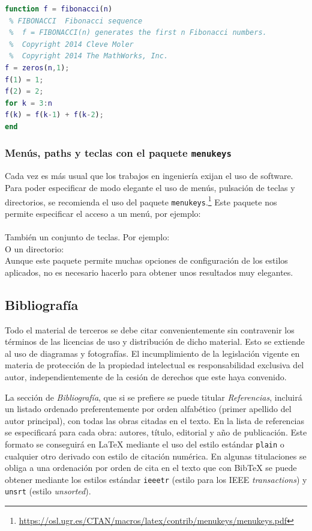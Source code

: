 \begin{lstlisting}[style=ruled,language=Matlab,caption={Ejemplo de script en Matlab},label=lst:matlab]
function f = fibonacci(n)
 % FIBONACCI  Fibonacci sequence
 %	f = FIBONACCI(n) generates the first n Fibonacci numbers.
 %	Copyright 2014 Cleve Moler
 %	Copyright 2014 The MathWorks, Inc.
f = zeros(n,1); 
f(1) = 1;
f(2) = 2;
for k = 3:n
f(k) = f(k-1) + f(k-2);
end
\end{lstlisting}



\subsubsection{Menús, paths y teclas con el paquete \texttt{menukeys}}
Cada vez es más usual que los trabajos en ingeniería exijan el uso de 
software. Para poder especificar de modo elegante el uso de menús, pulsación de 
teclas y directorios, se recomienda el uso del paquete 
\texttt{menukeys}.\footnote{\url{https://osl.ugr.es/CTAN/macros/latex/contrib/menukeys/menukeys.pdf}}
  Este paquete nos permite especificar el acceso a un menú, por 
ejemplo:\\

\noindent {}\\

\noindent También un conjunto de teclas. Por ejemplo:
\\

\noindent O un directorio:
\\

\noindent Aunque este paquete permite muchas opciones de configuración de los estilos aplicados, no es necesario hacerlo para obtener unos resultados muy elegantes.


\subsection{Bibliografía}
Todo el material de terceros se debe citar convenientemente sin contravenir los términos de las licencias de uso y distribución de dicho material. Esto se extiende al uso de diagramas y fotografías. El incumplimiento de la legislación vigente en materia de protección de la propiedad intelectual es responsabilidad exclusiva del autor, independientemente de la cesión de derechos que este haya convenido.

La sección de \emph{Bibliografía}, que si se prefiere se puede titular \emph{Referencias}, incluirá un listado ordenado preferentemente por orden alfabético (primer apellido del autor principal), con todas las obras citadas en el texto. En la lista de referencias se especificará para cada obra: autores, título, editorial y año de publicación. Este formato se conseguirá en \LaTeX{} mediante el uso del estilo estándar \texttt{plain} o cualquier otro derivado con estilo de citación numérica. En algunas titulaciones se obliga a una ordenación por orden de cita en el texto que con Bib\TeX{} se puede obtener mediante los estilos estándar \texttt{ieeetr} (estilo para los IEEE \emph{transactions}) y \texttt{unsrt} (estilo \emph{unsorted}). 

